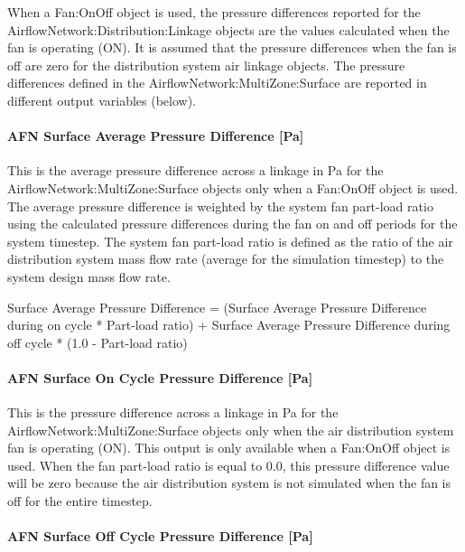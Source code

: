 When a Fan:OnOff object is used, the pressure differences reported for the AirflowNetwork:Distribution:Linkage objects are the values calculated when the fan is operating (ON). It is assumed that the pressure differences when the fan is off are zero for the distribution system air linkage objects. The pressure differences defined in the AirflowNetwork:MultiZone:Surface are reported in different output variables (below).

\paragraph{AFN Surface Average Pressure Difference {[}Pa{]}}\label{afn-surface-average-pressure-difference-pa}

This is the average pressure difference across a linkage in Pa for the AirflowNetwork:MultiZone:Surface objects only when a Fan:OnOff object is used. The average pressure difference is weighted by the system fan part-load ratio using the calculated pressure differences during the fan on and off periods for the system timestep. The system fan part-load ratio is defined as the ratio of the air distribution system mass flow rate (average for the simulation timestep) to the system design mass flow rate.

Surface Average Pressure Difference = (Surface Average Pressure Difference during on cycle * Part-load ratio) + Surface Average Pressure Difference during off cycle * (1.0 - Part-load ratio)

\paragraph{AFN Surface On Cycle Pressure Difference {[}Pa{]}}\label{afn-surface-on-cycle-pressure-difference-pa}

This is the pressure difference across a linkage in Pa for the AirflowNetwork:MultiZone:Surface objects only when the air distribution system fan is operating (ON). This output is only available when a Fan:OnOff object is used. When the fan part-load ratio is equal to 0.0, this pressure difference value will be zero because the air distribution system is not simulated when the fan is off for the entire timestep.

\paragraph{AFN Surface Off Cycle Pressure Difference {[}Pa{]}}\label{afn-surface-off-cycle-pressure-difference-pa}

